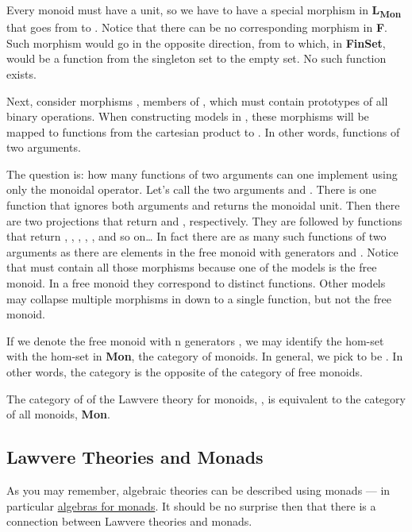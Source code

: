 Every monoid must have a unit, so we have to have a special morphism
 in \textbf{L\textsubscript{Mon}} that goes from  to
. Notice that there can be no corresponding morphism in
\textbf{F}. Such morphism would go in the opposite direction, from
 to  which, in \textbf{FinSet}, would be a function
from the singleton set to the empty set. No such function exists.

Next, consider morphisms , members of
, which must contain prototypes of all binary
operations. When constructing models in , these
morphisms will be mapped to functions from the cartesian product
 to . In other words, functions of
two arguments.

The question is: how many functions of two arguments can one implement
using only the monoidal operator. Let's call the two arguments
 and . There is one function that ignores both
arguments and returns the monoidal unit. Then there are two projections
that return  and , respectively. They are followed
by functions that return , , ,
, , and so on\ldots{} In fact there are as many
such functions of two arguments as there are elements in the free monoid
with generators  and . Notice that
 must contain all those morphisms because one of the
models is the free monoid. In a free monoid they correspond to distinct
functions. Other models may collapse multiple morphisms in
 down to a single function, but not the free monoid.

If we denote the free monoid with n generators , we may
identify the hom-set  with the hom-set
 in \textbf{Mon}, the category of monoids. In
general, we pick  to be . In
other words, the category  is the opposite of the category
of free monoids.

The category of  of the Lawvere theory for monoids,
, is equivalent to the category of all monoids,
\textbf{Mon}.

\subsection{Lawvere Theories and
Monads}\label{lawvere-theories-and-monads}

As you may remember, algebraic theories can be described using monads
--- in particular
\href{https://bartoszmilewski.com/2017/03/14/algebras-for-monads/}{algebras
for monads}. It should be no surprise then that there is a connection
between Lawvere theories and monads.

